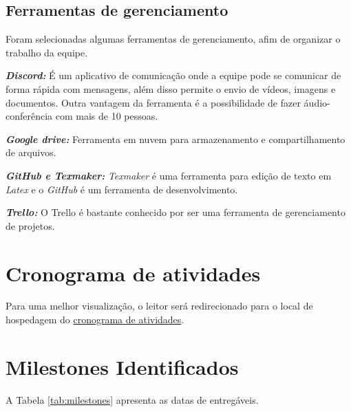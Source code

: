 \subsection{Ferramentas de gerenciamento}

Foram selecionadas algumas ferramentas de gerenciamento, afim de organizar o trabalho da equipe.

\emph{\textbf{Discord:}} É um aplicativo de comunicação onde a equipe pode se comunicar de forma rápida com mensagens, além disso permite o envio de vídeos, imagens e documentos. Outra vantagem da ferramenta é a possibilidade de fazer áudio-conferência com mais de 10 pessoas.

\emph{\textbf{Google drive:}} Ferramenta em nuvem para armazenamento e compartilhamento de arquivos.

\emph{\textbf{GitHub e Texmaker:}} \emph{Texmaker} é uma ferramenta para edição de texto em \emph{Latex} e o \emph{GitHub} é um ferramenta de desenvolvimento.

\emph{\textbf{Trello:}} O Trello é bastante conhecido por ser uma ferramenta de gerenciamento de projetos. 

\section{Cronograma de atividades}

Para uma melhor visualização, o leitor será redirecionado para o local de hospedagem do \href{https://docs.google.com/spreadsheets/d/1dcQycQPI0zbYMb-VP8nqHmpS_v0IhSz5-u9oQcoDKUI/edit?usp=sharing}{cronograma de atividades}.

\section{Milestones Identificados}

A Tabela \ref{tab:milestones} apresenta as datas de entregáveis.

